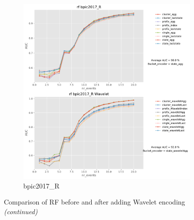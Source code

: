 \documentclass[twoside,11pt]{Latex/Classes/PhDthesisPSnPDF}
\begin{document}
\begin{figure}[!htbp]
	\medskip
	\begin{subfigure}{0.48\textwidth}
		\includegraphics[width=\linewidth]{images/wavelet/graphs2rf/bpic2017_R.pdf}	
		\caption{bpic2017\_R} 
	\end{subfigure}\hspace*{\fill}
	\caption{Comparison of RF before and after adding Wavelet encoding \textit{(continued)}}
	\label{fig:wr3}
\end{figure}




\end{document}

